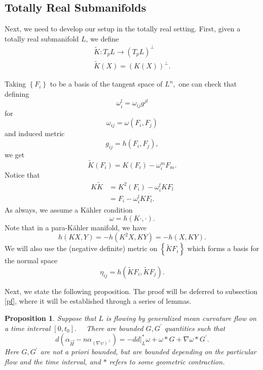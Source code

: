 \documentclass[12pt,letterpaper]{amsart}%
\newcounter{mycounter}
\numberwithin{mycounter}{section}
\theoremstyle{plain}
\newtheorem{proposition}[mycounter]{Proposition}
\numberwithin{equation}{section}
\theoremstyle{definition}
\begin{document}
\subsection{Totally Real Submanifolds}


Next, we need to develop our setup in the totally real setting. 
First, given a totally real submanifold $L$, we define
\begin{align*}
\tilde{K}    :T_{p}L\rightarrow\left(  T_{p}L\right)  ^{\perp}\\
 \tilde{K}(X)    =\left(  K(X)\right)  ^{\perp}.
\end{align*}


Taking $\left\{  F_{i}\right\}  $ to be a basis of the tangent space of
$L^{n},$ one can check that defining%
\[
\omega_{i}^{l}=\omega_{ij}g^{jl}%
\]
for
\[
\omega_{ij}=\omega(F_{i},F_{j})
\]
and induced metric
\[
g_{ij}=h(F_{i},F_{j}),
\]
we get
\begin{equation}
\label{define Ktwiddle}
\tilde{K}(F_{i})=K(F_{i})-\omega_{i}^{m}F_{m}.
\end{equation}
Notice that
\begin{align*}
K\tilde{K}  &  =K^{2}(F_{i})-\omega_{i}^{l}KF_{l}\\
&  =F_{i}-\omega_{i}^{l}KF_{l}.
\end{align*}
As always, we assume a K\"{a}hler condition%
\[
\omega=h(K\cdot,\cdot).
\]
Note that in a para-K\"{a}hler manifold, we have\
\[
h(KX,Y)=-h(K^{2}X,KY)=-h(X,KY).
\]
We will also use the (negative definite) metric on $\left\{  \tilde{K}%
F_{i}\right\}  $ which forms a basis for the normal space \
\[
\eta_{ij}=h(\tilde{K}F_{i},\tilde{K}F_{j}).
\]


Next, we state the following proposition. The proof will be deferred to subsection \ref{pf}, where it will be established through a series of lemmas.
\begin{proposition}\label{evl4}
Suppose that $L$ is flowing by generalized mean curvature flow on a time
interval $\left[ 0,t_{0}\right] .$ \ \ There are bounded $G,G^{\prime }$
quantities such that 
\begin{equation*}
d\left( \alpha _{\vec{H}}-n\alpha _{\left( \nabla \psi \right) ^{\perp
}}\right) =-dd|_{L}^{\ast }\omega +\omega\ast G+\nabla \omega \ast G^{\prime }.
\end{equation*}%
Here $G,G^{\prime }$ are not a priori bounded, but are bounded depending on the particular
flow and the time interval, and $*$ refers to some geometric contraction. 
\end{proposition}
\end{document}
